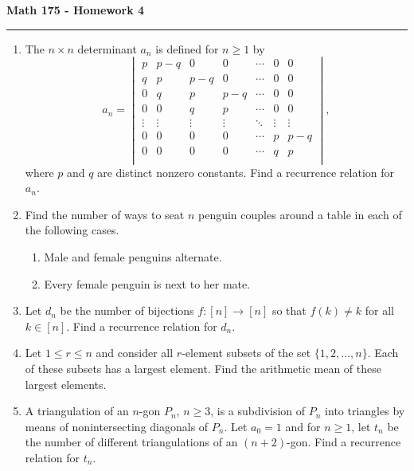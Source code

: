 \documentclass[11pt,letterpaper]{report}
\theoremstyle{definition}
\theoremstyle{remark}
\begin{document}
\begin{center}
{\bf \Large Math 175 - Homework 4}
\vspace{0.2cm}
\hrule
\end{center}

\begin{enumerate}

	\item The $n\times n$ determinant $a_n$ is defined for $n\geq 1$ by
    \[
    a_n = \begin{vmatrix}
    	p & p-q & 0 & 0 & \cdots & 0 & 0\\
    	q & p & p-q & 0 & \cdots & 0 & 0\\
    	0 & q & p & p-q & \cdots & 0 & 0\\
    	0 & 0 & q & p & \cdots & 0 & 0\\
    	\vdots & \vdots & \vdots & \vdots & \ddots & \vdots & \vdots\\
    	0 & 0 & 0 & 0 & \cdots & p & p-q\\
    	0 & 0 & 0 & 0 & \cdots & q & p\\   	
    \end{vmatrix},
    \]
    where $p$ and $q$ are distinct nonzero constants. Find a recurrence relation for $a_n$.

    \vfill

    \item Find the number of ways to seat $n$ penguin couples around a table in each of the following cases.
    \begin{enumerate}
    	\item Male and female penguins alternate.
    	\vfill
    	\item Every female penguin is next to her mate.
    \end{enumerate}

    \vfill

    \item Let $d_n$ be the number of bijections $f:[n]\to [n]$ so that $f(k)\neq k$ for all $k\in [n]$. Find a recurrence relation for $d_n$.
    
    \vfill

    \item Let $1\leq r\leq n$ and consider all $r$-element subsets of the set $\{1, 2, \ldots, n\}$. Each of these subsets has a largest element. Find the arithmetic mean of these largest elements.
    \vfill
    
    \item A triangulation of an $n$-gon $P_n$, $n\geq 3$, is a subdivision of $P_n$ into triangles by means of nonintersecting diagonals of $P_n$. Let $a_0 = 1$ and for $n\geq 1$, let $t_n$ be the number of different triangulations of an $(n+2)$-gon. Find a recurrence relation for $t_n$.
    
    \vfill
    
\end{enumerate}
\end{document}
